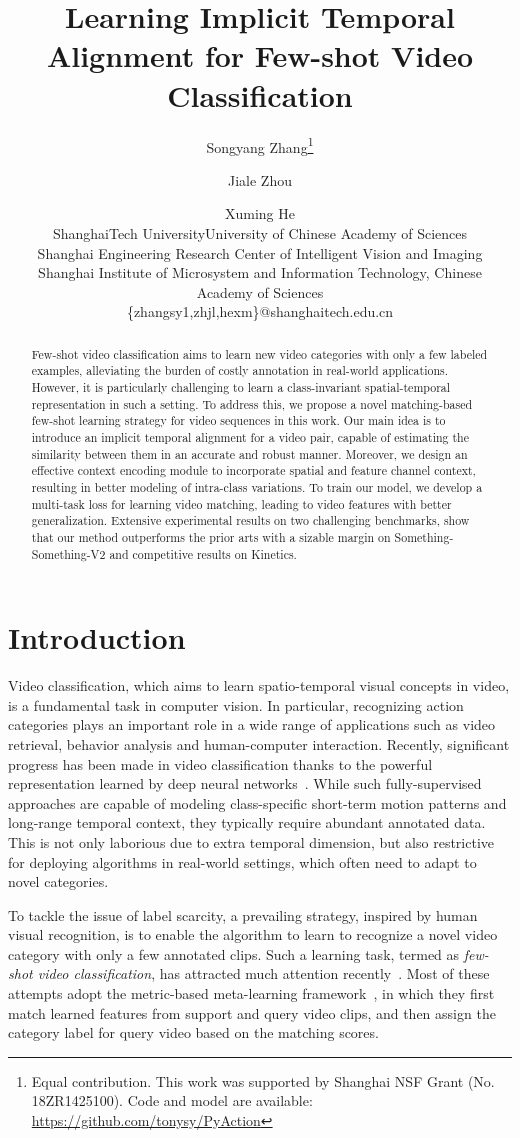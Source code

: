 \documentclass{article}
\title{Learning Implicit Temporal Alignment for Few-shot Video Classification}
\author{
Songyang Zhang\footnote{Equal contribution. This work was supported by Shanghai NSF Grant (No. 18ZR1425100). Code and model are available: \href{https://github.com/tonysy/PyAction}{https://github.com/tonysy/PyAction}}\and
Jiale Zhou\and
Xuming He\\
\affiliations
ShanghaiTech University\quad  University of Chinese Academy of Sciences\\ Shanghai Engineering Research Center of Intelligent Vision and Imaging\\Shanghai Institute of Microsystem and Information Technology, Chinese Academy of Sciences\\
\emails
\{zhangsy1,zhjl,hexm\}@shanghaitech.edu.cn
}
\begin{document}
\maketitle

\begin{abstract}
Few-shot video classification aims to learn new video categories with only a few labeled examples, alleviating the burden of costly annotation in real-world applications. However, it is particularly challenging to learn a class-invariant  spatial-temporal representation in such a setting. To address this, we propose a novel matching-based few-shot learning strategy for video sequences in this work. 
Our main idea is to introduce an implicit temporal alignment for a video pair, capable of estimating the similarity between them in an accurate and robust manner. Moreover, we design an effective context encoding module to incorporate spatial and feature channel context, resulting in better modeling of intra-class variations. 
To train our model, we develop a multi-task loss for learning video matching, leading to video features with better generalization. 
Extensive experimental results on two challenging benchmarks, show that our method outperforms the prior arts with a sizable margin on Something-Something-V2 and competitive results on Kinetics.
\end{abstract}

\section{Introduction}\label{sec:introduction}
Video classification, which aims to learn spatio-temporal visual concepts in video, is a fundamental task in computer vision. In particular, recognizing action categories plays an important role in a wide range of applications such as video retrieval, behavior analysis and human-computer interaction. Recently, significant progress has been made in video classification thanks to the powerful representation learned by deep neural networks~\cite{wang2016temporal,carreira2017quo,wang2018non}. 
While such fully-supervised approaches are capable of modeling class-specific short-term motion patterns and long-range temporal context, they typically require abundant annotated data. This is not only laborious due to extra temporal dimension, but also restrictive for deploying algorithms in real-world settings, which often need to adapt to novel categories.  


To tackle the issue of label scarcity, a prevailing strategy, inspired by human visual recognition, is to enable the algorithm to learn to recognize a novel video category with only a few annotated clips. Such a learning task, termed as \textit{few-shot video classification}, has attracted much attention recently~\cite{zhu2018compound,cao2020few,zhang2020few}. 
Most of these attempts adopt the metric-based meta-learning framework~\cite{vinyals2016matching}, in which they first match learned features from support and query video clips, and then assign the category label for query video based on the matching scores. 
\end{document}
